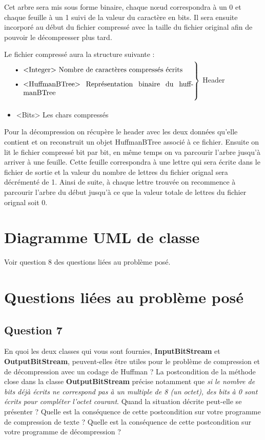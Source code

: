 \documentclass[11pt]{article}
\begin{document}
Cet arbre sera mis sous forme binaire, chaque nœud correspondra à un 0 et chaque feuille à un 1 suivi de la valeur du caractère en bits. Il sera ensuite incorporé au début du fichier compressé avec la taille du fichier original afin de pouvoir le décompresser plus tard.

Le fichier compressé aura la structure suivante : \\
$\left. \text{\parbox{0.76\linewidth}{
\begin{itemize}
\item <Integer> Nombre de caractères compressés écrits
\item <HuffmanBTree> Représentation binaire du huffmanBTree
\end{itemize}
}} \right \}$ Header 
\begin{itemize}
\item <Bits> Les chars compressés \\
\end{itemize} 

Pour la décompression on récupère le header avec les deux données qu'elle contient et on reconstruit un objet HuffmanBTree associé à ce fichier. Ensuite on lit le fichier compressé bit par bit, en même temps on va parcourir l'arbre jusqu'à arriver à une feuille. Cette feuille correspondra à une lettre qui sera écrite dans le fichier de sortie et la valeur du nombre de lettres du fichier orignal sera décrémenté de 1. Ainsi de suite, à chaque lettre trouvée on recommence à parcourir l'arbre du début jusqu'à ce que la valeur totale de lettres du fichier orignal soit 0.


\section{Diagramme UML de classe}
Voir question 8 des questions liées au problème posé.

\section{Questions liées au problème posé}

\subsection*{Question 7}

En quoi les deux classes qui vous sont fournies, \textbf{InputBitStream} et \textbf{OutputBitStream}, peuvent-elles être utiles pour le problème de compression et de décompression avec un codage de Huffman ?
La postcondition de la méthode close dans la classe \textbf{OutputBitStream} précise notamment que \textit{si le nombre de bits déjà écrits ne correspond pas à un multiple de 8 (un octet), des bits à 0 sont écrits pour compléter l’octet courant}. Quand la situation décrite peut-elle se présenter ? Quelle est la conséquence de cette postcondition sur votre programme de compression de texte ? Quelle est la conséquence de cette postcondition sur votre programme de décompression ? \\
\end{document}

